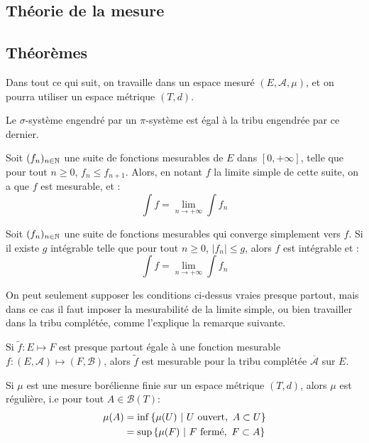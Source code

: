 \documentclass[11pt,a4paper]{article}
\begin{document}
\newpage
\begin{center}
\section{Théorie de la mesure} 
\end{center}


\subsection*{Théorèmes}
Dans tout ce qui suit, on travaille dans un espace mesuré $(E,\mathcal{A},\mu)$, et on pourra utiliser un espace métrique $(T,d)$.


\begin{thm}[Dynkin] 
Le $\sigma$-système engendré par un $\pi$-système est égal à la tribu engendrée par ce dernier.
\end{thm}


\begin{thm}
Soit $(f_n)_{n\in\mathbb N}$ une suite de fonctions mesurables de $E$ dans $[0,+\infty]$, telle que pour tout $n\geq 0$, $f_n \leq f_{n+1}  $. Alors, en notant $f$ la limite simple de cette suite, on a que $f$ est mesurable, et : 
\[\int f = \lim\limits_{n \to +\infty} \int f_n \]
\end{thm}


\begin{thm}
Soit $(f_n)_{n\in\mathbb N}$ une suite de fonctions mesurables qui converge simplement vers $f$. Si il existe $g$ intégrable telle que pour tout $n \geq 0$, $\left| f_n \right| \leq g$, alors $f$ est intégrable et :
\[\int f = \lim\limits_{n \to +\infty} \int f_n \]
\end{thm}


\begin{rmq}
On peut seulement supposer les conditions ci-dessus vraies presque partout, mais dans ce cas il faut imposer la mesurabilité de la limite simple, ou bien travailler dans la tribu complétée, comme l'explique la remarque suivante.
\end{rmq}


\begin{rmq}
Si $\tilde{f} : E \mapsto F$ est presque partout égale à une fonction mesurable $f : (E,\mathcal{A}) \mapsto (F,\mathcal{B})$, alors $\tilde{f}$ est mesurable pour la tribu complétée $\overline{\mathcal{A}}$ sur $E$.
\end{rmq}

\begin{thm}
Si $\mu$ est une mesure borélienne finie sur un espace métrique $(T,d)$, alors $\mu$ est régulière, i.e pour tout $A \in \mathcal{B}(T)$:
\begin{align*}
\mu(A) &= \inf \left\{ \mu(U) \ \middle| \ U \text{ ouvert},\  A \subset U \right\} \\
&=\sup \left\{ \mu(F) \ \middle| \ F \text{ fermé}, \ F \subset A \right\}
\end{align*}
\end{thm}
\end{document}
